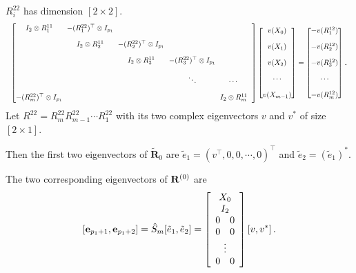 \documentclass[mathserif, handout]{beamer}
\begin{document}
\begin{frame}[allowframebreaks]
\begin{itemize}
       $R^{22}_i$ has dimension $[2\!\times\! 2]$.
       \begin{equation}
         \label{eq:xdpsdcomplex}
         \resizebox{\linewidth}{!}{%
           $
           \setlength{\arraycolsep}{3pt}
           \begin{bmatrix}
             I_{2}\otimes R^{11}_{1} & -(R^{22}_{1})^\top \otimes I_{p_{1}} &  & \\[1em]
             & I_{2}\otimes R^{11}_{2} & -(R^{22}_{2})^\top  \otimes I_{p_{1}} &  &\\[1em]
             &  & I_{2}\otimes R^{11}_{3} & -(R^{22}_{3})^\top \otimes I_{p_{1}} &  &\\[1em]
             & & & \ddots &\cdots & \\[1em]
             -(R^{22}_{m})^\top \otimes I_{p_{1}} & & & & I_{2}\otimes R^{11}_{m}
           \end{bmatrix}
           \begin{bmatrix}
             v(X_{0}) \\[1em]
             v(X_{1})  \\[1em]
             v(X_{2})  \\[1em]
             \cdots \\[1em]
             v(X_{m-1})
           \end{bmatrix}
           =
           \begin{bmatrix}
             -v(R^{12}_{1}) \\[1em]
             -v(R^{12}_{2}) \\[1em]
             -v(R^{12}_{3}) \\[1em]
             \cdots \\[1em]
             -v(R^{12}_{m})
           \end{bmatrix} $%
         }
         \,.
       \end{equation}
       Let $R^{22}=R^{22}_{m}R^{22}_{m-1}\cdots R^{22}_{1}$ with its two complex 
       eigenvectors $v$ and $v^{*}$ of size $[2\!\times\! 1]$. 

       Then the first two eigenvectors of  $\mathbf{\tilde{R}}_{0}$ are
       $\tilde{e}_{1}=(v^\top,0,0,\cdots,0)^\top $ and
       $\tilde{e}_{2}=(\tilde{e}_{1})^{*}$. 
       
       The two corresponding eigenvectors of $\ps{R}{0}$ are
       \[
       \left[\jEigvec[p_{1}+1],\jEigvec[p_{1}+2]\right]
       =\hat{S}_{m}[\tilde{e}_{1},\tilde{e}_{2}]
       = \left[
         \begin{array}{c}
           X_{0} \\
           I_{2}    \\
           0 \quad 0\\
           0 \quad 0\\
           \vdots\\
           0 \quad 0
         \end{array}
       \right]
       [v,v^{*}]
       \,.
       \]
       

\end{itemize}
\end{frame}
\end{document}
